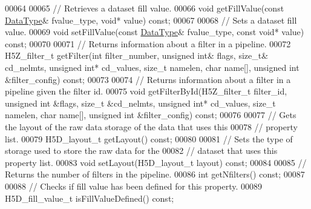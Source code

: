 \begin{DoxyCode}
00064 
00065         \textcolor{comment}{// Retrieves a dataset fill value.}
00066         \textcolor{keywordtype}{void} getFillValue(\textcolor{keyword}{const} \hyperlink{class_h5_1_1_data_type}{DataType}& fvalue\_type, \textcolor{keywordtype}{void}* value) \textcolor{keyword}{const};
00067 
00068         \textcolor{comment}{// Sets a dataset fill value.}
00069         \textcolor{keywordtype}{void} setFillValue(\textcolor{keyword}{const} \hyperlink{class_h5_1_1_data_type}{DataType}& fvalue\_type, \textcolor{keyword}{const} \textcolor{keywordtype}{void}* value) \textcolor{keyword}{const};
00070 
00071         \textcolor{comment}{// Returns information about a filter in a pipeline.}
00072         H5Z\_filter\_t getFilter(\textcolor{keywordtype}{int} filter\_number, \textcolor{keywordtype}{unsigned} \textcolor{keywordtype}{int}& flags, \textcolor{keywordtype}{size\_t}& cd\_nelmts, \textcolor{keywordtype}{unsigned} \textcolor{keywordtype}{int}* 
      cd\_values, \textcolor{keywordtype}{size\_t} namelen, \textcolor{keywordtype}{char} name[], \textcolor{keywordtype}{unsigned} \textcolor{keywordtype}{int} &filter\_config) \textcolor{keyword}{const};
00073 
00074         \textcolor{comment}{// Returns information about a filter in a pipeline given the filter id.}
00075         \textcolor{keywordtype}{void} getFilterById(H5Z\_filter\_t filter\_id, \textcolor{keywordtype}{unsigned} \textcolor{keywordtype}{int} &flags, \textcolor{keywordtype}{size\_t} &cd\_nelmts, \textcolor{keywordtype}{unsigned} \textcolor{keywordtype}{int}* 
      cd\_values, \textcolor{keywordtype}{size\_t} namelen, \textcolor{keywordtype}{char} name[], \textcolor{keywordtype}{unsigned} \textcolor{keywordtype}{int} &filter\_config) \textcolor{keyword}{const};
00076 
00077         \textcolor{comment}{// Gets the layout of the raw data storage of the data that uses this}
00078         \textcolor{comment}{// property list.}
00079         H5D\_layout\_t getLayout() \textcolor{keyword}{const};
00080 
00081         \textcolor{comment}{// Sets the type of storage used to store the raw data for the}
00082         \textcolor{comment}{// dataset that uses this property list.}
00083         \textcolor{keywordtype}{void} setLayout(H5D\_layout\_t layout) \textcolor{keyword}{const};
00084 
00085         \textcolor{comment}{// Returns the number of filters in the pipeline.}
00086         \textcolor{keywordtype}{int} getNfilters() \textcolor{keyword}{const};
00087 
00088         \textcolor{comment}{// Checks if fill value has been defined for this property.}
00089         H5D\_fill\_value\_t isFillValueDefined() \textcolor{keyword}{const};

\end{DoxyCode}
